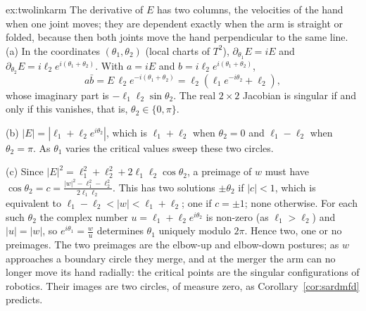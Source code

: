 \begin{solution}{ex:twolinkarm}
\idea The derivative of $E$ has two columns, the velocities of the hand when one joint moves; they are dependent exactly when the arm is straight or
folded, because then both joints move the hand perpendicular to the same line.
\writeup (a) In the coordinates $(\theta_1,\theta_2)$ (local charts of $T^2$), $\partial_{\theta_1}E=iE$ and $\partial_{\theta_2}E=i\ell_2e^{i(\theta_1+\theta_2)}$.
With $a=iE$ and $b=i\ell_2e^{i(\theta_1+\theta_2)}$,
\[
a\bar b=E\,\ell_2e^{-i(\theta_1+\theta_2)}=\ell_2(\ell_1e^{-i\theta_2}+\ell_2),
\]
whose imaginary part is $-\ell_1\ell_2\sin\theta_2$. The real $2\times2$ Jacobian is singular if and only if this vanishes, that is, $\theta_2\in\{0,\pi\}$.

(b) $|E|=|\ell_1+\ell_2e^{i\theta_2}|$, which is $\ell_1+\ell_2$ when $\theta_2=0$ and $\ell_1-\ell_2$ when $\theta_2=\pi$. As $\theta_1$ varies the critical
values sweep these two circles.

(c) Since $|E|^2=\ell_1^2+\ell_2^2+2\ell_1\ell_2\cos\theta_2$, a preimage of $w$ must have $\cos\theta_2=c=\frac{|w|^2-\ell_1^2-\ell_2^2}{2\ell_1\ell_2}$. This has
two solutions $\pm\theta_2$ if $|c|<1$, which is equivalent to $\ell_1-\ell_2<|w|<\ell_1+\ell_2$; one if $c=\pm1$; none otherwise. For each such $\theta_2$
the complex number $u=\ell_1+\ell_2e^{i\theta_2}$ is non-zero (as $\ell_1>\ell_2$) and $|u|=|w|$, so $e^{i\theta_1}=\frac wu$ determines $\theta_1$ uniquely
modulo $2\pi$. Hence two, one or no preimages. The two preimages are the elbow-up and elbow-down postures; as $w$ approaches a boundary circle they merge,
and at the merger the arm can no longer move its hand radially: the critical points are the singular configurations of robotics. Their images are two
circles, of measure zero, as Corollary~\ref{cor:sardmfd} predicts.
\end{solution}


